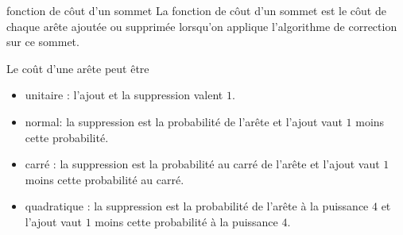 \begin{definition}{ fonction de c\^out d'un sommet} \newline
La fonction de c\^out d'un sommet est le c\^out de chaque ar\^ete ajout\'ee ou supprim\'ee lorsqu'on applique l'algorithme de correction sur ce sommet.
\end{definition}
Le co\^ut d'une ar\^ete peut \^etre
\begin{itemize}
	\item unitaire : l'ajout et la suppression valent $1$.
	\item normal: la suppression est la probabilit\'e de l'ar\^ete et l'ajout vaut  $1$ moins cette probabilit\'e.
	\item carr\'e : la suppression est la probabilit\'e au carr\'e de l'ar\^ete et l'ajout vaut  $1$ moins cette probabilit\'e au carr\'e.
	\item quadratique :  la suppression est la probabilit\'e de l'ar\^ete \`a la puissance $4$ et l'ajout vaut  $1$ moins cette probabilit\'e \`a la puissance $4$.
\end{itemize}